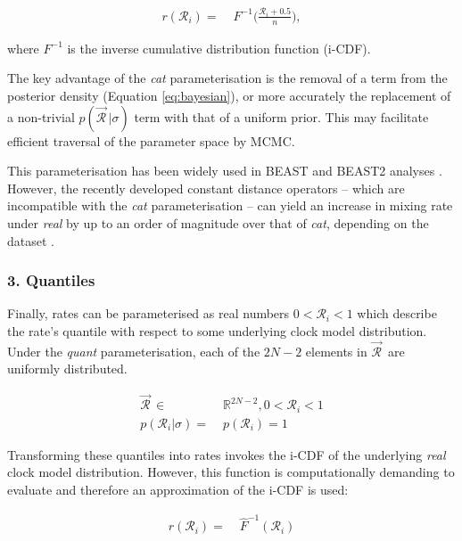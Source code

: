 \documentclass[10pt,letterpaper]{article}
\begin{document}
\begin{align}
r(\mathcal{R}_i) =& \; F^{-1}\big(\frac{\mathcal{R}_i + 0.5}{n}\big),
\end{align}

where $F^{-1}$ is the inverse cumulative distribution function (i-CDF).



The key advantage of the \textit{cat} parameterisation is the removal of a term from the posterior density (Equation \ref{eq:bayesian}), or more accurately the replacement of a non-trivial $p(\vec{\mathcal{R}}^{\,} | \sigma)$ term with that of a uniform prior. 
This may facilitate efficient traversal of the parameter space by MCMC.




This parameterisation has been widely used in BEAST and BEAST2 analyses \cite{drummond2006relaxed}. 
However, the recently developed constant distance operators  -- which are incompatible with the \textit{cat} parameterisation -- can yield an increase in mixing rate under \textit{real} by up to an order of magnitude over that of \textit{cat}, depending on the dataset \cite{zhang2020improving}. 






\subsubsection*{3. Quantiles}


Finally, rates can be parameterised as real numbers $0 < \mathcal{R}_i < 1$ which describe the rate's quantile with respect to some underlying clock model distribution. Under the  \textit{quant} parameterisation, each of the $2N-2$ elements in $\vec{\mathcal{R}}^{\,}$ are uniformly distributed.


\begin{align}
\vec{\mathcal{R}}^{\,} \in & \; \mathbb{R}^{2N-2}, 0 < \mathcal{R}_i < 1  \\
p(\mathcal{R}_i | \sigma) = & \; p(\mathcal{R}_i) = 1
\end{align}


Transforming these quantiles into rates invokes the i-CDF of the underlying \textit{real} clock model distribution.
However, this function is computationally demanding to evaluate and therefore an approximation of the i-CDF is used:



\begin{align}
r(\mathcal{R}_i) =& \; \hat{F}^{-1}(\mathcal{R}_i)
\end{align}
\end{document}
